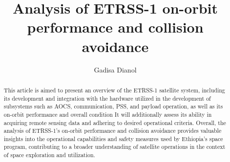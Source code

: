 \documentclass[final,5p,times,twocolumn]{elsarticle}
\begin{document}
\begin{frontmatter}

\title{Analysis of ETRSS-1 on-orbit performance and collision avoidance}

\author[1]{Gadisa Dianol}

\begin{abstract}
This article is aimed  to present an overview of the ETRSS-1 satellite system, including its development and integration with the hardware utilized in the development of subsystems such as AOCS, communication, PSS, and payload operation, as well as its on-orbit performance and overall condition It will additionally assess its ability in acquiring remote sensing data and adhering to desired operational criteria. Overall, the analysis of ETRSS-1's on-orbit performance and collision avoidance provides valuable insights into the operational capabilities and safety measures used by Ethiopia's space program, contributing to a broader understanding of satellite operations in the context of space exploration and utilization.
\end{abstract}



\end{frontmatter}
\end{document}
